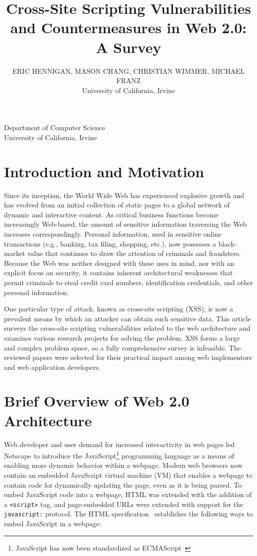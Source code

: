 \documentclass{acmtrans2m}
\title{Cross-Site Scripting Vulnerabilities and Countermeasures in Web 2.0: A Survey}
\author{ERIC HENNIGAN, MASON CHANG, CHRISTIAN WIMMER, MICHAEL FRANZ\\
University of California, Irvine}
\begin{document}
\setcounter{page}{1}

\begin{bottomstuff}
Department of Computer Science\\University of California, Irvine
\end{bottomstuff}

\maketitle

\section{Introduction and Motivation}
Since its inception, the World Wide Web has experienced explosive growth and has evolved from an initial collection of static pages to a global network of dynamic and interactive content.
As critical business functions become increasingly Web-based, the amount of sensitive information traversing the Web increases correspondingly.
Personal information, used in sensitive online transactions (e.g., banking, tax filing, shopping, etc.), now possesses a black-market value that continues to draw the attention of criminals and fraudsters.
Because the Web was neither designed with these uses in mind, nor with an explicit focus on security, it contains inherent architectural weaknesses that permit criminals to steal credit card numbers, identification credentials, and other personal information.

One particular type of attack, known as cross-site scripting (XSS), is now a prevalent means by which an attacker can obtain such sensitive data.
This article surveys the cross-site scripting vulnerabilities related to the web architecture and examines various research projects for solving the problem.
XSS forms a large and complex problem space, so a fully comprehensive survey is infeasible.
The reviewed papers were selected for their practical impact among web implementors and web application developers.

\section{Brief Overview of Web 2.0 Architecture}\label{sec:web-architecture}

Web developer and user demand for increased interactivity in web pages led Netscape to introduce the JavaScript\footnote{JavaScript has now been standardized as ECMAScript~\cite{ECMA-262}} programming language as a means of enabling more dynamic behavior within a webpage.
Modern web browsers now contain an embedded JavaScript virtual machine (VM) that enables a webpage to contain code for dynamically updating the page, even as it is being parsed.
To embed JavaScript code into a webpage, HTML was extended with the addition of a \texttt{<script>} tag, and page-embedded URLs were extended with support for the \texttt{javascript:} protocol.
The HTML specification~\cite{htmlSpec} establishes the following ways to embed JavaScript in a webpage:
\end{document}
